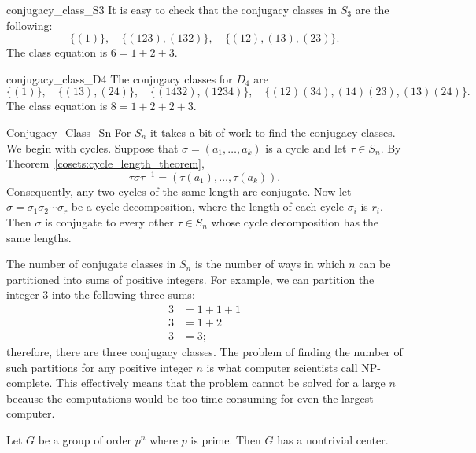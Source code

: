  
\begin{example}{conjugacy_class_S3}
It is easy to check that  the conjugacy classes in $S_3$ are the
following: 
\[
\{ (1) \},  \quad \{ (123), (132) \}, \quad \{(12), (13), (23) \}.
\]
The class equation is $6 = 1+2+3$.
\end{example}
 
 
\begin{example}{conjugacy_class_D4}
The conjugacy classes for $D_4$ are
\[
\{ (1) \}, \quad
\{ (13), (24) \}, \quad
\{ (1432), (1234) \}, \quad
\{ (12)(34), (14)(23), (13)(24) \}.
\]
The class equation is $8 = 1 + 2 + 2 + 3$.
\end{example}
 
 
\begin{example}{Conjugacy_Class_Sn}
For $S_n$ it takes a bit of work to find the conjugacy classes.  We
begin with cycles.  Suppose that $\sigma = ( a_1, \ldots, a_k)$ is a
cycle and let $\tau \in S_n$. By Theorem~\ref{cosets:cycle_length_theorem},
\[
\tau \sigma \tau^{-1} = ( \tau( a_1), \ldots, \tau(a_k)).
\]
Consequently, any two cycles of the same length are conjugate. Now let
$\sigma = \sigma_1 \sigma_2 \cdots \sigma_r$ be a cycle decomposition,
where the length of each cycle $\sigma_i$ is $r_i$. Then $\sigma$ is
conjugate to every other $\tau \in S_n$ whose cycle decomposition has
the same lengths. 
 
 
The number of conjugate classes in $S_n$ is the number of ways in
which $n$ can be partitioned into sums of positive integers. For
example, we can partition the integer 3 into the following three sums: 
\begin{align*}
3 & =  1 + 1 + 1 \\
3 & =  1 + 2 \\
3 & =  3;
\end{align*}
therefore, there are three conjugacy classes. The problem of finding
the number of such partitions for any positive integer $n$ is what
computer scientists call {\bfi NP-complete}.  This effectively means
that the problem cannot be solved for a large $n$ because the
computations would be too time-consuming for even the largest computer. 
\end{example}
 
 

 
 
\begin{theorem}\label{pn_theorem}
Let $G$ be a group of order $p^n$ where $p$ is prime. Then $G$ has a
nontrivial center. 
\end{theorem}
 
